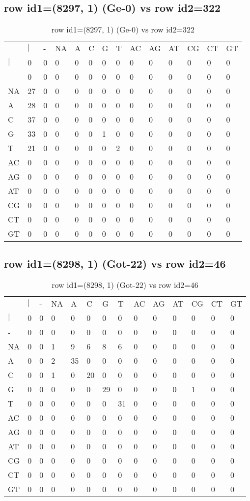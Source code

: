 \subsection{row id1=(8297, 1) (Ge-0) vs row id2=322}
\begin{center}
\begin{longtable}{|l|l|l|l|l|l|l|l|l|l|l|l|l|l|}
\caption{row id1=(8297, 1) (Ge-0) vs row id2=322} \label{table_dm472}\\
\hline
\\
\hline
&$|$&-&NA&A&C&G&T&AC&AG&AT&CG&CT&GT\\
$|$&0&0&0&0&0&0&0&0&0&0&0&0&0\\
-&0&0&0&0&0&0&0&0&0&0&0&0&0\\
NA&27&0&0&0&0&0&0&0&0&0&0&0&0\\
A&28&0&0&0&0&0&0&0&0&0&0&0&0\\
C&37&0&0&0&0&0&0&0&0&0&0&0&0\\
G&33&0&0&0&0&1&0&0&0&0&0&0&0\\
T&21&0&0&0&0&0&2&0&0&0&0&0&0\\
AC&0&0&0&0&0&0&0&0&0&0&0&0&0\\
AG&0&0&0&0&0&0&0&0&0&0&0&0&0\\
AT&0&0&0&0&0&0&0&0&0&0&0&0&0\\
CG&0&0&0&0&0&0&0&0&0&0&0&0&0\\
CT&0&0&0&0&0&0&0&0&0&0&0&0&0\\
GT&0&0&0&0&0&0&0&0&0&0&0&0&0\\
\hline
\end{longtable}
\end{center}

\subsection{row id1=(8298, 1) (Got-22) vs row id2=46}
\begin{center}
\begin{longtable}{|l|l|l|l|l|l|l|l|l|l|l|l|l|l|}
\caption{row id1=(8298, 1) (Got-22) vs row id2=46} \label{table_dm474}\\
\hline
\\
\hline
&$|$&-&NA&A&C&G&T&AC&AG&AT&CG&CT&GT\\
$|$&0&0&0&0&0&0&0&0&0&0&0&0&0\\
-&0&0&0&0&0&0&0&0&0&0&0&0&0\\
NA&0&0&1&9&6&8&6&0&0&0&0&0&0\\
A&0&0&2&35&0&0&0&0&0&0&0&0&0\\
C&0&0&1&0&20&0&0&0&0&0&0&0&0\\
G&0&0&0&0&0&29&0&0&0&0&1&0&0\\
T&0&0&0&0&0&0&31&0&0&0&0&0&0\\
AC&0&0&0&0&0&0&0&0&0&0&0&0&0\\
AG&0&0&0&0&0&0&0&0&0&0&0&0&0\\
AT&0&0&0&0&0&0&0&0&0&0&0&0&0\\
CG&0&0&0&0&0&0&0&0&0&0&0&0&0\\
CT&0&0&0&0&0&0&0&0&0&0&0&0&0\\
GT&0&0&0&0&0&0&0&0&0&0&0&0&0\\
\hline
\end{longtable}
\end{center}


